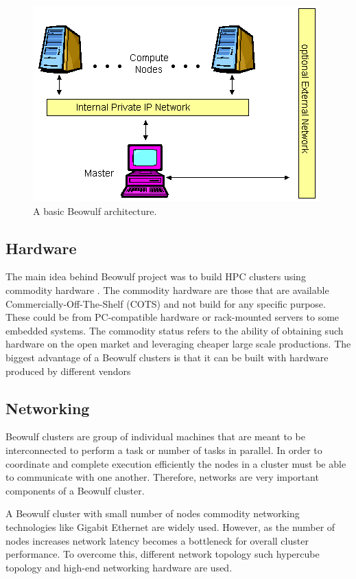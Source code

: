 \begin{figure}[!htb]
  \center
  \includegraphics[width=.75 \linewidth]{figs/beowulf_arch.png}
  \caption{A basic Beowulf architecture. \citep{Beowulf:img}}
  \label{fig:beowulf_arch}
\end{figure}

\subsection{Hardware}
The main idea behind Beowulf project was to build HPC clusters using commodity hardware \citep{Gropp:beowulf}. The commodity hardware are those that are available Commercially-Off-The-Shelf (COTS) and not build for any specific purpose. These could be from PC-compatible hardware or rack-mounted servers to some embedded systems. The commodity status refers to the ability of obtaining such hardware on the open market and leveraging cheaper large scale productions. The biggest advantage of a Beowulf clusters is that it can be built with hardware produced by different vendors\citep{Thiru:05}

\subsection{Networking}
Beowulf clusters are group of individual machines that are meant to be interconnected to perform a task or number of tasks in parallel. In order to coordinate and complete execution efficiently the nodes in a cluster must be able to communicate with one another. Therefore, networks are very important components of a Beowulf cluster\citep{Gropp:beowulf}.

A Beowulf cluster with small number of nodes commodity networking technologies like Gigabit Ethernet are widely used. However, as the number of nodes increases network latency becomes a bottleneck for overall cluster performance. To overcome this, different network topology such hypercube topology and high-end networking hardware are used\citep{Thiru:05}.

